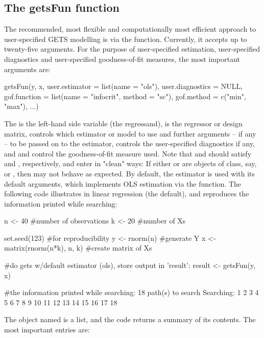 \subsection{The getsFun function}

The recommended, most flexible and computationally most efficient approach to user-specified GETS modelling is via the  function. Currently, it accepts up to twenty-five arguments. For the purpose of user-specified estimation, user-specified diagnostics and user-specified goodness-of-fit measures, the most important arguments are:
%
\begin{example}
  getsFun(y, x,
    user.estimator = list(name = "ols"),
    user.diagnostics = NULL,
    gof.function = list(name = "infocrit", method = "sc"),
    gof.method = c("min", "max"),
    ...)
\end{example}
%
The  is the left-hand side variable (the regressand),  is the regressor or design matrix,  controls which estimator or model to use and further arguments -- if any -- to be passed on to the estimator,  controls the user-specified diagnostics if any, and  and  control the goodness-of-fit measure used. Note that  and  should satisfy  and , respectively, and enter in "clean" ways: If either  or  are objects of class, say,  or , then  may not behave as expected. By default, the estimator  is used with its default arguments, which implements OLS estimation via the  function. The following code illustrates  in linear regression (the default), and reproduces the information printed while searching:
%
\begin{example}
  n <- 40 #number of observations
  k <- 20 #number of Xs

  set.seed(123) #for reproducibility
  y <- rnorm(n) #generate Y
  x <- matrix(rnorm(n*k), n, k) #create matrix of Xs

  #do gets w/default estimator (ols), store output in 'result':
  result <- getsFun(y, x)

  #the information printed while searching:
  18 path(s) to search
  Searching: 1 2 3 4 5 6 7 8 9 10 11 12 13 14 15 16 17 18 
\end{example}
%
The object named  is a list, and the code  returns a summary of its contents. The most important entries are:
